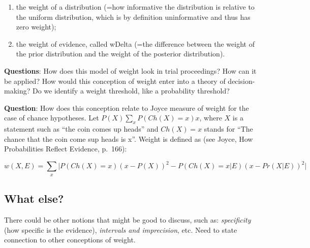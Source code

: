 \documentclass[
  10pt,
  dvipsnames,enabledeprecatedfontcommands]{scrartcl}
\begin{document}
\begin{enumerate}
\def\labelenumi{(\alph{enumi})}
\item
  the weight of a distribution (=how informative the distribution is
  relative to the uniform distribution, which is by definition
  uninformative and thus has zero weight);
\item
  the weight of evidence, called wDelta (=the difference between the
  weight of the prior distribution and the weight of the posterior
  distribution).
\end{enumerate}

\textbf{Questions}: How does this model of weight look in trial
proceedings? How can it be applied? How would this conception of weight
enter into a theory of decision-making? Do we identify a weight
threshold, like a probability threshold?


\textbf{Question}: How does this conception relate to Joyce measure of
weight for the case of chance hypotheses. Let
\(P(X)\sum_x P(Ch(X)=x)x\), where \(X\) is a statement such as ``the
coin comes up heads'' and \(Ch(X)=x\) stands for ``The chance that the
coin come sup heads is x''. Weight is defined as (see Joyce, How
Probabilities Reflect Evidence, p.~166):

\[w(X, E) = \sum_x \vert P(Ch(X)=x)(x-P(X))^2 - P(Ch(X)=x \vert E)(x-Pr(X \vert E))^2\vert\]


\hypertarget{what-else}{%
\subsection{What else?}\label{what-else}}

There could be other notions that might be good to discuss, such as:
\emph{specificity} (how specific is the evidence), \emph{intervals and
imprecision}, etc. Need to state connection to other conceptions of
weight.

\end{document}
